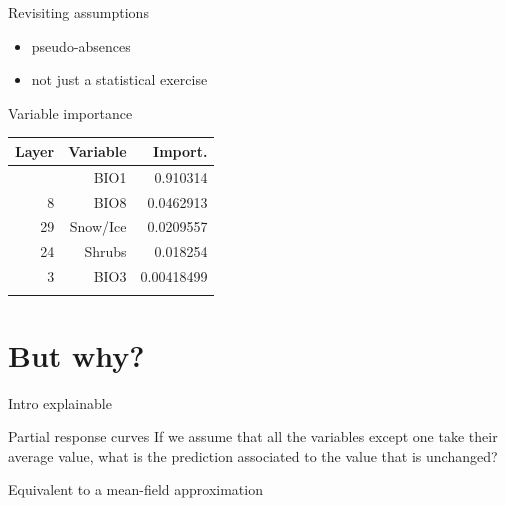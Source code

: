 \documentclass[12pt, smalloffset, compress, aspectratio=1610]{beamer}
\providecommand{\tightlist}{%
  \setlength{\itemsep}{0pt}\setlength{\parskip}{0pt}}
\begin{document}
\begin{frame}{Revisiting assumptions}
\label{revisiting-assumptions}
\begin{itemize}
\tightlist
\item
  pseudo-absences
\item
  not just a statistical exercise
\end{itemize}
\end{frame}

\begin{frame}{Variable importance}
\label{variable-importance}
\begin{longtable}[]{@{}rrr@{}}
\toprule\noalign{}
\textbf{Layer} & \textbf{Variable} & \textbf{Import.} \\
\midrule\noalign{}
\endhead
1 & BIO1 & 0.910314 \\
8 & BIO8 & 0.0462913 \\
29 & Snow/Ice & 0.0209557 \\
24 & Shrubs & 0.018254 \\
3 & BIO3 & 0.00418499 \\
\bottomrule\noalign{}
\end{longtable}
\end{frame}

\section{But why?}\label{but-why-1}

\begin{frame}{Intro explainable}
\label{intro-explainable}
\end{frame}

\begin{frame}{Partial response curves}
\label{partial-response-curves}
If we assume that all the variables except one take their average value,
what is the prediction associated to the value that is unchanged?

Equivalent to a mean-field approximation
\end{frame}
\end{document}
